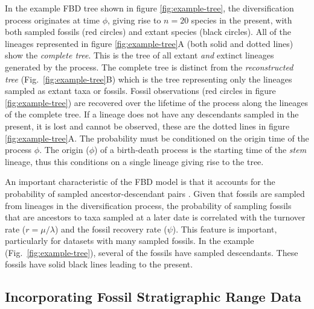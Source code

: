 In the example FBD tree shown in figure \ref{fig:example-tree}, the diversification process originates at time $\phi$, giving rise to $n=20$ species in the present, with both sampled fossils (red circles) and extant species (black circles). 
All of the lineages represented in figure \ref{fig:example-tree}A (both solid and dotted lines) show the \textit{complete tree}. 
This is the tree of all extant \textit{and} extinct lineages generated by the process.
The complete tree is distinct from the \textit{reconstructed tree} (Fig.\ \ref{fig:example-tree}B) which is the tree representing only the lineages sampled as extant taxa or fossils.
Fossil observations (red circles in figure \ref{fig:example-tree}) are recovered over the lifetime of the process along the lineages of the complete tree. 
If a lineage does not have any descendants sampled in the present, it is lost and cannot be observed, these are the dotted lines in figure \ref{fig:example-tree}A. 
The probability must be conditioned on the origin time of the process $\phi$. 
The origin ($\phi$) of a birth-death process is the starting time of the \textit{stem} lineage, thus this conditions on a single lineage giving rise to the tree.


An important characteristic of the FBD model is that it accounts for the probability of sampled ancestor-descendant pairs \citep{foote1996}. 
Given that fossils are sampled from lineages in the diversification process, the probability of sampling fossils that are ancestors to taxa sampled at a later date is correlated with the turnover rate ($r=\mu/\lambda$) and the fossil recovery rate ($\psi$).
This feature is important, particularly for datasets with many sampled fossils. 
In the example (Fig.\ \ref{fig:example-tree}), several of the fossils have sampled descendants. These fossils have solid black lines leading to the present. 

\bigskip
\subsection{Incorporating Fossil Stratigraphic Range Data}\label{subsect:Intro-TipSampling}

